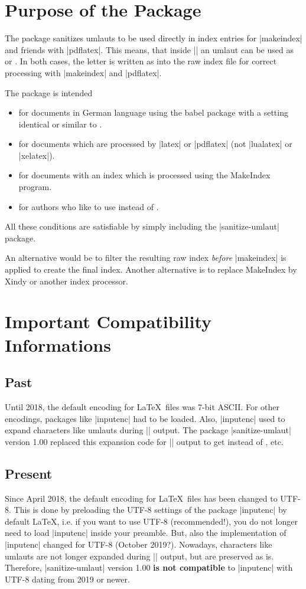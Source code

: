 \documentclass[a4paper,11pt]{ltxdoc}
\begin{document}
\clearpage
\section{Purpose of the Package}%
The package sanitizes umlauts to be used directly in index entries for
|makeindex| and friends with |pdflatex|. This means, that inside |\index| an umlaut can
be used as  or . In both cases, the letter is written
as  into the raw index file for correct processing with |makeindex|
and |pdflatex|.

The package is intended
\begin{itemize}
\item for documents in German language using the babel package with a setting
  identical or similar to \myverb{\usepackage[ngerman]{babel}}.
\item for documents which are processed by |latex| or |pdflatex| (not |lualatex| or |xelatex|).
\item for documents with an index which is processed using the
  MakeIndex program.
\item for authors who like to use  instead of
  .
\end{itemize}

All these conditions are satisfiable by simply including the |sanitize-umlaut|
package.

An alternative would be to filter the resulting raw  index
\emph{before} |makeindex| is applied to create the final  index.
Another alternative is to replace MakeIndex by Xindy or another index
processor.


\section{Important Compatibility Informations}%

\subsection{Past}
Until 2018, the default encoding for \LaTeX\ files was 7-bit ASCII.
For other encodings, packages like |inputenc| had to be loaded.
Also, |inputenc| used to expand characters like umlauts during |\index| output.
The package |sanitize-umlaut| version 1.00 replaced this expansion code
for |\index| output to get  instead of , etc.

\subsection{Present}
Since April 2018, the default encoding for \LaTeX\ files has been changed to UTF-8.
This is done by preloading the UTF-8 settings of the package |inputenc|
by default \LaTeX, i.e. if you want to use UTF-8 (recommended!), you do not
longer need to load |inputenc| inside your preamble.
But, also the implementation of |inputenc| changed for UTF-8 (October 2019?).
Nowadays, characters like umlauts are not longer expanded during |\index| output,
but are preserved as is.
Therefore, |sanitize-umlaut| version 1.00 \textbf{is not compatible} to
|inputenc| with UTF-8 dating from 2019 or newer.
\end{document}
